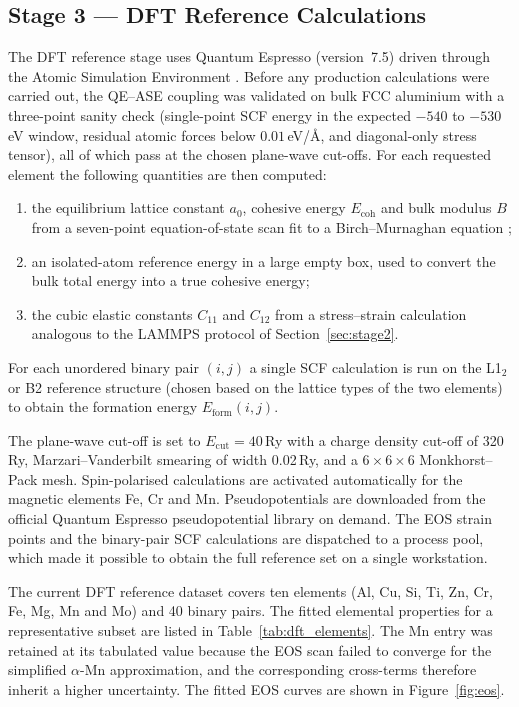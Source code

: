 \subsection{Stage 3 --- DFT Reference Calculations}
\label{sec:stage3}

The DFT reference stage uses Quantum Espresso \citep{giannozzi2009}
(version~7.5) driven through the Atomic Simulation Environment
\citep{ase2017}. Before any production calculations were carried out, the
QE--ASE coupling was validated on bulk FCC aluminium with a three-point
sanity check (single-point SCF energy in the expected $-540$ to
$-530$\,eV window, residual atomic forces below $0.01$\,eV/\AA, and
diagonal-only stress tensor), all of which pass at the chosen plane-wave
cut-offs. For each requested element the following quantities are then
computed:

\begin{enumerate}
	\item the equilibrium lattice constant $a_0$, cohesive energy
	      $E_\mathrm{coh}$ and bulk modulus $B$ from a seven-point
	      equation-of-state scan fit to a Birch--Murnaghan equation
	      \citep{birch};
	\item an isolated-atom reference energy in a large empty box, used
	      to convert the bulk total energy into a true cohesive energy;
	\item the cubic elastic constants $C_{11}$ and $C_{12}$ from a
	      stress--strain calculation analogous to the LAMMPS protocol
	      of Section~\ref{sec:stage2}.
\end{enumerate}
For each unordered binary pair $(i,j)$ a single SCF calculation is run on
the L1$_2$ or B2 reference structure (chosen based on the lattice types of
the two elements) to obtain the formation energy
$E_\mathrm{form}(i,j)$.

The plane-wave cut-off is set to $E_\mathrm{cut}=40$\,Ry with a charge
density cut-off of 320\,Ry, Marzari--Vanderbilt smearing of width
0.02\,Ry, and a $6\!\times\!6\!\times\!6$ Monkhorst--Pack mesh.
Spin-polarised calculations are activated automatically for the magnetic
elements Fe, Cr and Mn. Pseudopotentials are downloaded from the official
Quantum Espresso pseudopotential library on demand. The EOS strain points
and the binary-pair SCF calculations are dispatched to a process pool,
which made it possible to obtain the full reference set on a single
workstation.

The current DFT reference dataset covers ten elements (Al, Cu, Si, Ti, Zn,
Cr, Fe, Mg, Mn and Mo) and 40 binary pairs. The fitted
elemental properties for a representative subset are listed in
Table~\ref{tab:dft_elements}. The Mn entry was retained at its tabulated
value because the EOS scan failed to converge for the simplified
$\alpha$-Mn approximation, and the corresponding cross-terms therefore
inherit a higher uncertainty. The fitted EOS curves are shown in
Figure~\ref{fig:eos}.

